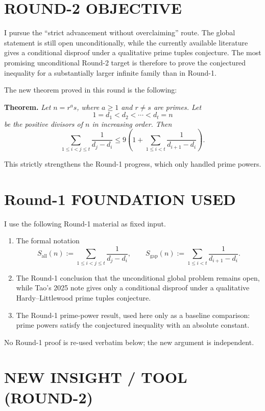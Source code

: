 \section{ROUND-2 OBJECTIVE}

I pursue the ``strict advancement without overclaiming'' route. The global statement is still open unconditionally, while the currently available literature gives a conditional disproof under a qualitative prime tuples conjecture. The most promising unconditional Round-2 target is therefore to prove the conjectured inequality for a substantially larger infinite family than in Round-1.

The new theorem proved in this round is the following:

\medskip

\noindent\textbf{Theorem.}
\emph{Let \(n=r^{a}s\), where \(a\geq 1\) and \(r\neq s\) are primes. Let}
\[
1=d_1<d_2<\cdots<d_t=n
\]
\emph{be the positive divisors of \(n\) in increasing order. Then}
\[
\sum_{1\leq i<j\leq t}\frac{1}{d_j-d_i}
\leq 9\left(1+\sum_{1\leq i<t}\frac{1}{d_{i+1}-d_i}\right).
\]

This strictly strengthens the Round-1 progress, which only handled prime powers.

\section{Round-1 FOUNDATION USED}

I use the following Round-1 material as fixed input.

\begin{enumerate}
\item The formal notation
\[
S_{\mathrm{all}}(n):=\sum_{1\le i<j\le t}\frac{1}{d_j-d_i},
\qquad
S_{\mathrm{gap}}(n):=\sum_{1\le i<t}\frac{1}{d_{i+1}-d_i}.
\]
\item The Round-1 conclusion that the unconditional global problem remains open, while Tao's 2025 note gives only a conditional disproof under a qualitative Hardy--Littlewood prime tuples conjecture.
\item The Round-1 prime-power result, used here only as a baseline comparison: prime powers satisfy the conjectured inequality with an absolute constant.
\end{enumerate}

No Round-1 proof is re-used verbatim below; the new argument is independent.

\section{NEW INSIGHT / TOOL (ROUND-2)}

